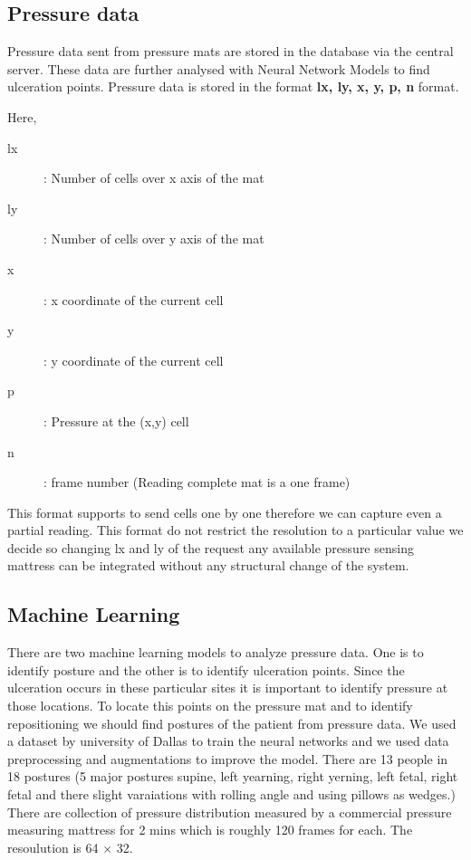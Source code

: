 \subsection{Pressure data}

Pressure data sent from pressure mats are stored in the database via the central server. These data are further analysed with Neural Network Models to find ulceration points. Pressure data is stored in the format \textbf{lx, ly, x, y, p, n} format. 

Here,

\begin{description}
	\item[lx]: Number of cells over x axis of the mat 
	\item[ly]: Number of cells over y axis of the mat 
	\item[x]: x coordinate of the current cell 
	\item[y]: y coordinate of the current cell  
	\item[p]: Pressure at the (x,y) cell
	\item[n]: frame number (Reading complete mat is a one frame)  
\end{description}

This format supports to send cells one by one therefore we can capture even a partial reading. This format do not restrict the resolution to a particular value we decide so changing lx and ly of the request any available pressure sensing mattress can be integrated without any structural change of the system. 

\subsection{Machine Learning}

There are two machine learning models to analyze pressure data. One is to identify posture and the other is to identify ulceration points. Since the ulceration occurs in these particular sites it is important to identify pressure at those locations. To locate this points on the pressure mat and to identify repositioning we should find postures of the patient from pressure data. 
We used a dataset by university of Dallas to train the neural networks and we used data preprocessing and augmentations to improve the model. There are 13 people in 18 postures (5 major postures supine, left yearning, right yerning, left fetal, right fetal and there slight varaiations with rolling angle and using pillows as wedges.) There are collection of pressure distribution measured by a commercial pressure measuring mattress for 2 mins which is roughly 120 frames for each. The resoulution is 64 $\times$ 32.

